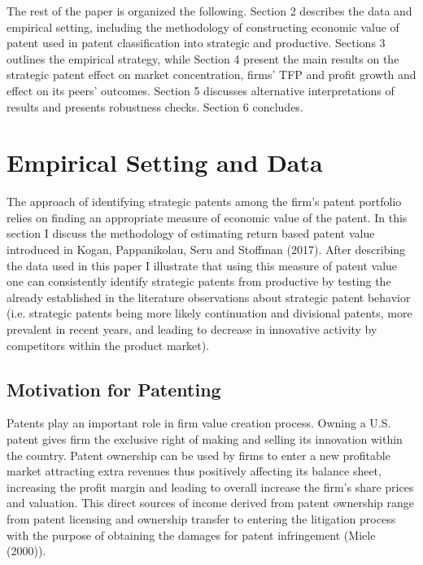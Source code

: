 \documentclass[11pt]{article}
\begin{document}
The rest of the paper is organized the following. Section 2 describes the data and empirical setting, including the methodology of constructing economic value of patent used in patent classification into strategic and productive. Sections 3 outlines the empirical strategy, while Section 4 present the main results on the strategic patent effect on market concentration, firms' TFP and profit growth and effect on its peers' outcomes. Section 5 discusses alternative interpretations of results and presents robustness checks. Section 6 concludes.        

\section{Empirical Setting and Data} \label{sec:Data}

The approach of identifying strategic patents among the firm's patent portfolio relies on finding an appropriate measure of economic value of the patent. In this section I discuss the methodology of estimating return based patent value introduced in \color{blue} Kogan, Pappanikolau, Seru and Stoffman (2017)\color{black}. After describing the data used in this paper I illustrate that using this measure of patent value one can consistently identify strategic patents from productive by testing the already established in  the literature observations about strategic patent behavior (i.e. strategic patents being more likely continuation and divisional patents, more prevalent in recent years, and leading to decrease in innovative activity by competitors within the product market).       

\subsection{Motivation for Patenting}

Patents play an important role in firm value creation process. Owning a U.S. patent gives firm the exclusive right of making and selling its innovation within the country. Patent ownership can be used by firms to enter a new profitable market attracting extra revenues thus positively affecting its balance sheet, increasing the profit margin and leading to overall increase the firm's share prices and valuation. This direct sources of income derived from patent ownership range from patent licensing and ownership transfer to entering the litigation process with the purpose of obtaining the damages for patent infringement \color{blue}(Miele (2000))\color{black}.  
\end{document}
